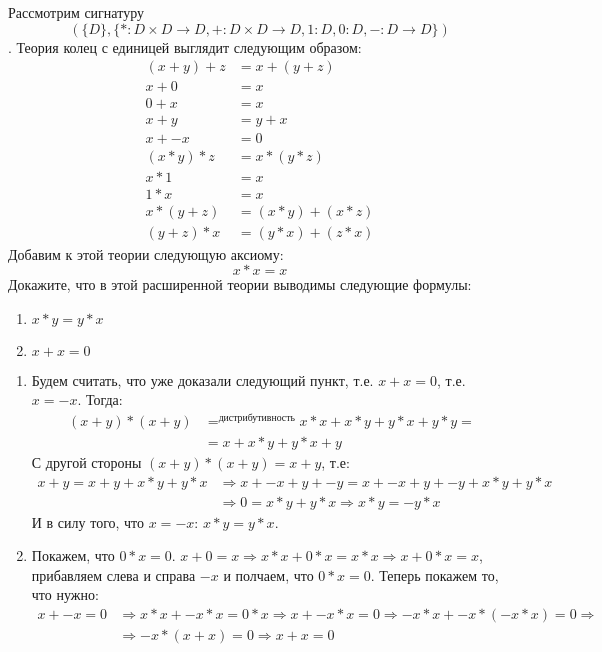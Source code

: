 \begin{task}[4]
Рассмотрим сигнатуру 
\[ (\{D\}, \{ * : D \times D \to D, + : D \times D \to D, 1 : D, 0 : D, - : D \to D \}) \].
    Теория колец с единицей выглядит следующим образом:
\begin{align*}
(x + y) + z & = x + (y + z) \\
x + 0 & = x \\
0 + x & = x \\
x + y & = y + x \\
x + -x & = 0 \\
(x * y) * z & = x * (y * z) \\
x * 1 & = x \\
1 * x & = x \\
x * (y + z) & = (x * y) + (x * z) \\
(y + z) * x & = (y * x) + (z * x)
\end{align*}
Добавим к этой теории следующую аксиому:
\[ x * x = x \]
Докажите, что в этой расширенной теории выводимы следующие формулы:
\begin{enumerate}
\item $x * y = y * x$
\item $x + x = 0$
\end{enumerate}
\end{task}
\begin{solution}

\begin{enumerate}
	\item Будем считать, что уже доказали следующий пункт, т.е. $x + x = 0$, т.е. $x = -x$. Тогда:
	\begin{align*}
		(x + y) * (x + y) &=^{\text{дистрибутивность}} x*x + x*y + y*x + y*y = \\
 				          &= x + x*y + y*x + y
	\end{align*}
	С другой стороны $(x+y)*(x+y) = x+y$, т.е: 
	\begin{align*}
		x + y = x + y + x*y + y*x &\Rightarrow x + -x + y + -y = x + -x + y + -y +  x*y + y*x \\
							      &\Rightarrow 0 = x*y + y*x \Rightarrow x*y = -y*x
	\end{align*}
	И в силу того, что $x = -x$: $x*y = y*x$.
	\item 
	Покажем, что $0*x = 0$. $x + 0 = x \Rightarrow x*x + 0*x = x*x \Rightarrow x + 0*x = x$, прибавляем слева и справа $-x$ и полчаем, что $0*x = 0$.
	Теперь покажем то, что нужно:
	\begin{align*}
		x + -x = 0 &\Rightarrow x*x + -x*x = 0*x \Rightarrow x + -x*x = 0 \Rightarrow -x*x + -x*(-x*x) = 0 \Rightarrow \\
				   &\Rightarrow -x*(x + x) = 0 \Rightarrow x + x = 0
	\end{align*}
\end{enumerate}

\end{solution}



